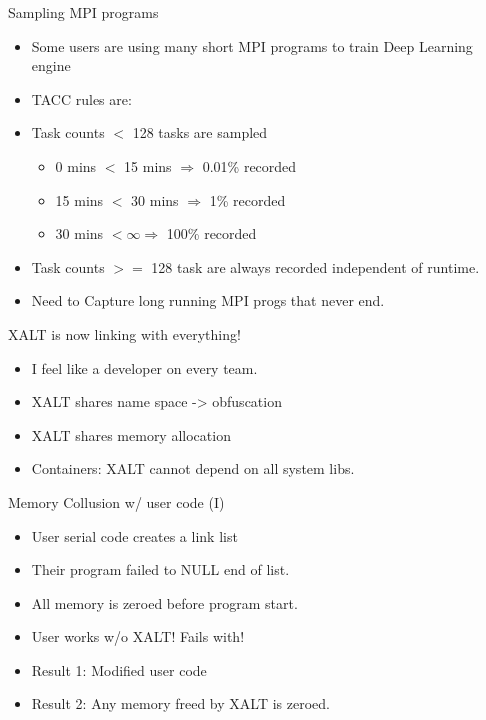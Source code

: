 \documentclass{beamer}
\begin{document}
\begin{frame}{Sampling MPI programs}
  \begin{itemize}
    \item Some users are using many short MPI programs to train Deep
      Learning engine
    \item TACC rules are:
    \item Task counts $<$ 128 tasks are sampled
      \begin{itemize}
        \item 0 mins $<$ 15 mins $\Rightarrow$ 0.01\% recorded  
        \item 15 mins $<$ 30 mins $\Rightarrow$ 1\% recorded  
        \item 30 mins $<  \infty \Rightarrow$ 100\% recorded
      \end{itemize}
    \item Task counts $>=$ 128 task are always recorded independent of runtime.
    \item Need to Capture long running MPI progs that never end.
  \end{itemize}
\end{frame}

\begin{frame}{XALT is now linking with everything!}
  \begin{itemize}
    \item I feel like a developer on every team.
    \item XALT shares name space -> obfuscation
    \item XALT shares memory allocation
    \item Containers: XALT cannot depend on all system libs.
  \end{itemize}
\end{frame}

\begin{frame}{Memory Collusion w/ user code (I)}
  \begin{itemize}
    \item User serial code creates a link list
    \item Their program failed to NULL end of list.
    \item All memory is zeroed before program start.
    \item User works w/o XALT! Fails with!
    \item Result 1: Modified user code
    \item Result 2: Any memory freed by XALT is zeroed.
  \end{itemize}
\end{frame}
\end{document}
